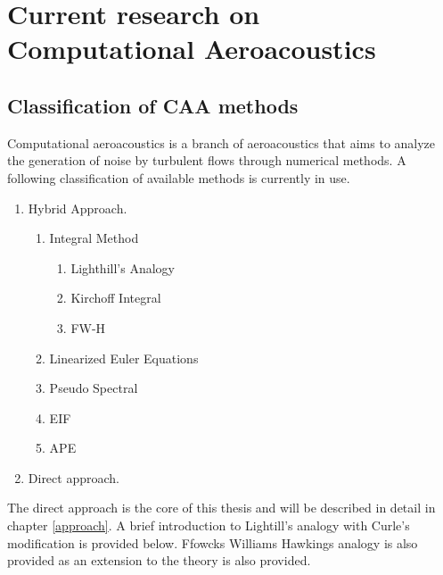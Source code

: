
\chapter{Current research on Computational Aeroacoustics} %

\label{CAA} %


\section{Classification of CAA methods}
Computational aeroacoustics is a branch of aeroacoustics that aims to analyze the generation of noise by turbulent flows through numerical methods. A following classification of available methods is currently in use.

\begin{enumerate}
   \item Hybrid Approach.
   \begin{enumerate}
     \item Integral Method
     \begin{enumerate}
     	\item Lighthill's Analogy
     	\item Kirchoff Integral
     	\item FW-H
     \end{enumerate}
     \item Linearized Euler Equations
     \item Pseudo Spectral
     \item EIF
     \item APE
   \end{enumerate}
   \item Direct approach.
\end{enumerate}

The direct approach is the core of this thesis and will be described in detail in chapter \ref{approach}. A brief introduction to Lightill's analogy with Curle's modification is provided below. Ffowcks Williams Hawkings analogy is also provided as an extension to the theory is also provided.

